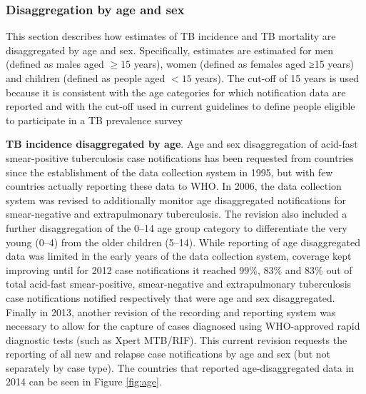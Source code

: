\subsubsection{Disaggregation by age and sex}

This section describes how estimates of TB incidence and TB mortality are disaggregated by age and sex. Specifically, estimates are estimated for men (defined as males aged $\geq 15$ years), women (defined as females aged ≥15 years) and children (defined as people aged $<15$ years). The cut-off of 15 years is used because it is consistent with the age categories for which notification data are reported and with the cut-off used in current guidelines to define people eligible to participate in a TB prevalence\cite{WHO2011} survey

\textbf{TB incidence disaggregated by age}. Age and sex disaggregation of acid-fast smear-positive tuberculosis case notifications has been requested from countries since the establishment of the data collection system in 1995, but with few countries actually reporting these data to WHO. In 2006, the data collection system was revised to additionally monitor age disaggregated notifications for smear-negative and extrapulmonary tuberculosis. The revision also included a further disaggregation of the 0–14 age group category to differentiate the very young (0–4) from the older children (5–14). While reporting of age disaggregated data was limited in the early years of the data collection system, coverage kept improving until for 2012 case notifications it reached 99\%, 83\% and 83\% out of total acid-fast smear-positive, smear-negative and extrapulmonary tuberculosis case notifications notified respectively that were age and sex disaggregated. Finally in 2013, another revision of the recording and reporting system was necessary to allow for the capture of cases diagnosed using WHO-approved rapid diagnostic tests (such as Xpert MTB/RIF)\cite{Who2013-td}. This current revision requests the reporting of all new and relapse case notifications by age and sex (but not separately by case type). The countries that reported age-disaggregated data in 2014 can be seen in Figure \ref{fig:age}.



